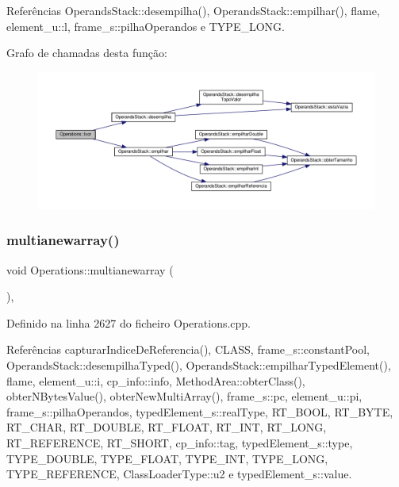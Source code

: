 Referências Operands\+Stack\+::desempilha(), Operands\+Stack\+::empilhar(), flame, element\+\_\+u\+::l, frame\+\_\+s\+::pilha\+Operandos e T\+Y\+P\+E\+\_\+\+L\+O\+NG.

Grafo de chamadas desta função\+:
\nopagebreak
\begin{figure}[H]
\begin{center}
\leavevmode
\includegraphics[width=350pt]{classOperations_ac135e723f1ac6a27c736e6b8e7d06a45_cgraph}
\end{center}
\end{figure}
\mbox{\label{classOperations_a78c45edfcdf63668974ffc3b2d84a309}} 
\subsubsection{\texorpdfstring{multianewarray()}{multianewarray()}}
{\footnotesize\ttfamily void Operations\+::multianewarray (\begin{DoxyParamCaption}{ }\end{DoxyParamCaption})\hspace{0.3cm}{\ttfamily [static]}, {\ttfamily [private]}}



Definido na linha 2627 do ficheiro Operations.\+cpp.



Referências capturar\+Indice\+De\+Referencia(), C\+L\+A\+SS, frame\+\_\+s\+::constant\+Pool, Operands\+Stack\+::desempilha\+Typed(), Operands\+Stack\+::empilhar\+Typed\+Element(), flame, element\+\_\+u\+::i, cp\+\_\+info\+::info, Method\+Area\+::obter\+Class(), obter\+N\+Bytes\+Value(), obter\+New\+Multi\+Array(), frame\+\_\+s\+::pc, element\+\_\+u\+::pi, frame\+\_\+s\+::pilha\+Operandos, typed\+Element\+\_\+s\+::real\+Type, R\+T\+\_\+\+B\+O\+OL, R\+T\+\_\+\+B\+Y\+TE, R\+T\+\_\+\+C\+H\+AR, R\+T\+\_\+\+D\+O\+U\+B\+LE, R\+T\+\_\+\+F\+L\+O\+AT, R\+T\+\_\+\+I\+NT, R\+T\+\_\+\+L\+O\+NG, R\+T\+\_\+\+R\+E\+F\+E\+R\+E\+N\+CE, R\+T\+\_\+\+S\+H\+O\+RT, cp\+\_\+info\+::tag, typed\+Element\+\_\+s\+::type, T\+Y\+P\+E\+\_\+\+D\+O\+U\+B\+LE, T\+Y\+P\+E\+\_\+\+F\+L\+O\+AT, T\+Y\+P\+E\+\_\+\+I\+NT, T\+Y\+P\+E\+\_\+\+L\+O\+NG, T\+Y\+P\+E\+\_\+\+R\+E\+F\+E\+R\+E\+N\+CE, Class\+Loader\+Type\+::u2 e typed\+Element\+\_\+s\+::value.

